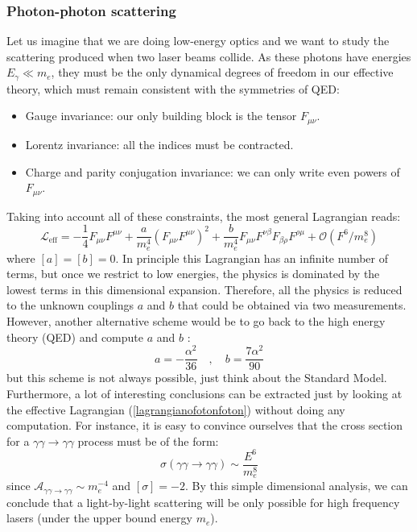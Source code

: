 \documentclass[11pt]{article}
\begin{document}
\subsubsection{Photon-photon scattering}
Let us imagine that we are doing low-energy optics and we want to study the scattering produced when two laser beams collide. As these photons have energies $E_\gamma\ll m_e$, they must be the only dynamical degrees of freedom in our effective theory, which must remain consistent with the symmetries of QED:
\begin{itemize}
    \item Gauge invariance: our only building block is the tensor $F_{\mu\nu}$.
    \item Lorentz invariance: all the indices must be contracted.
    \item Charge and parity conjugation invariance: we can only write even powers of $F_{\mu\nu}$.
\end{itemize}
Taking into account all of these constraints, the most general Lagrangian reads:
\begin{equation}\label{lagrangianofotonfoton}
    \mathcal{L}_{\text{eff}}=-\dfrac{1}{4}F_{\mu\nu}F^{\mu\nu}+\dfrac{a}{m_e^4}(F_{\mu\nu}F^{\mu\nu})^2+\dfrac{b}{m_e^4}F_{\mu\nu}F^{\nu\beta}F_{\beta\rho}F^{\rho\mu}+\mathcal{O}(F^6/m_e^8)
\end{equation}
where $[a]=[b]=0$. In principle this Lagrangian has an infinite number of terms, but once we restrict to low energies, the physics is dominated by the lowest terms in this dimensional expansion. Therefore, all the physics is reduced to the unknown couplings $a$ and $b$ that could be obtained via two measurements. However, another alternative scheme would be to go back to the high energy theory (QED) and compute $a$ and $b$ \cite{heisenberg2006consequencesdiractheorypositron}:
\begin{equation}
    a=-\dfrac{\alpha^2}{36}\quad ,\quad  b=\dfrac{7\alpha^2}{90}
\end{equation}
but this scheme is not always possible, just think about the Standard Model. Furthermore, a lot of interesting conclusions can be extracted just by looking at the effective Lagrangian (\ref{lagrangianofotonfoton}) without doing any computation. For instance, it is easy to convince ourselves that the cross section for a $\gamma\gamma\to \gamma\gamma$ process must be of the form:
\begin{equation}
    \sigma(\gamma\gamma\to \gamma\gamma)\sim\dfrac{E^6}{m_e^8}
\end{equation}
since $\mathcal{A}_{\gamma\gamma\to \gamma\gamma}\sim m_e^{-4}$ and $[\sigma]=-2$. By this simple dimensional analysis, we can conclude that a light-by-light scattering will be only possible for high frequency lasers (under the upper bound energy $m_e$).
\end{document}
